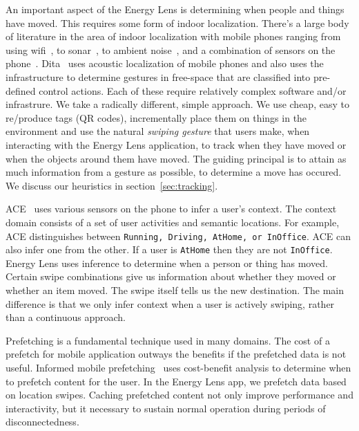 An important aspect of the Energy Lens is determining when people and things have moved.  This requires some form 
of indoor localization.  There's a large body of literature in the area of indoor localization with mobile phones ranging from 
using wifi~\cite{radar}, to sonar~\cite{cricket}, to ambient noise~\cite{abs}, and a combination of sensors on the 
phone~\cite{surroundsense}.  Dita~\cite{dita} uses acoustic localization of mobile phones and also uses the infrastructure 
to determine gestures in free-space that are classified into pre-defined control actions.  Each of these require relatively complex 
software and/or infrastrure.  
We take a radically different, simple approach.  We use cheap, easy to re/produce tags (QR codes), incrementally place them on things in the 
environment and use the natural \emph{swiping gesture} that users make, when interacting with the Energy Lens 
application, to track when they have moved or when the objects around them have moved.  The guiding principal is to attain as much 
information from a gesture as possible, to determine a move has occured.  We discuss our heuristics in section~\ref{sec:tracking}.

ACE~\cite{ACE} uses various sensors on the phone to infer a user's context.  The context domain consists of a set of user activities
and semantic locations.  For example, ACE distinguishes between {\tt Running, Driving, AtHome, or InOffice}.  ACE can also infer 
one from the other.  If a user is {\tt AtHome} then they are not {\tt InOffice}.  Energy Lens uses inference to determine
when a person or thing has moved.  Certain swipe combinations give us information about whether they moved or
whether an item moved.  The swipe itself tells us the new destination.  The main difference is that we only infer context 
when a user is actively swiping, rather
than a continuous approach.  

Prefetching is a fundamental technique used in many domains.  The cost of a prefetch for mobile
application outways the benefits if the prefetched data is not useful.  Informed mobile prefetching~\cite{imp_mobisys2012} uses cost-benefit analysis 
to determine when to prefetch content for the user.  In the Energy Lens app, we prefetch data based on location swipes.
Caching prefetched content not only improve performance and interactivity, but it necessary to sustain normal
operation during periods of disconnectedness.

